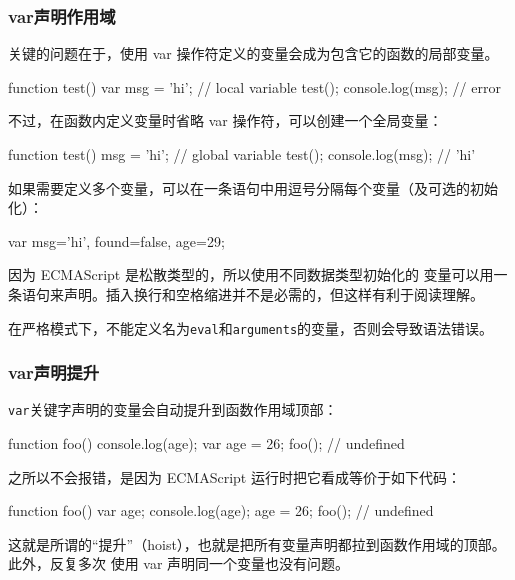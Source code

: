 \subsubsection{var声明作用域}
关键的问题在于，使用 var 操作符定义的变量会成为包含它的函数的局部变量。
\begin{js}
    function test(){
            var msg = 'hi'; // local variable
        }
    test();
    console.log(msg); // error
\end{js}

不过，在函数内定义变量时省略 var 操作符，可以创建一个全局变量：
\begin{js}
    function test(){
            msg = 'hi'; // global variable
        }
    test();
    console.log(msg); // 'hi'
\end{js}


如果需要定义多个变量，可以在一条语句中用逗号分隔每个变量（及可选的初始化）：
\begin{js}
    var msg='hi',
    found=false,
    age=29;
\end{js}

因为 ECMAScript 是松散类型的，所以使用不同数据类型初始化的
变量可以用一条语句来声明。插入换行和空格缩进并不是必需的，但这样有利于阅读理解。

在严格模式下，不能定义名为\verb|eval|和\verb|arguments|的变量，否则会导致语法错误。
\subsubsection{var声明提升}
\verb|var|关键字声明的变量会自动提升到函数作用域顶部：
\begin{js}
    function foo() {
            console.log(age);
            var age = 26;
        }
    foo(); // undefined
\end{js}

之所以不会报错，是因为 ECMAScript 运行时把它看成等价于如下代码：
\begin{js}
    function foo() {
            var age;
            console.log(age);
            age = 26;
        }
    foo(); // undefined
\end{js}

这就是所谓的“提升”（hoist），也就是把所有变量声明都拉到函数作用域的顶部。此外，反复多次
使用 var 声明同一个变量也没有问题。
